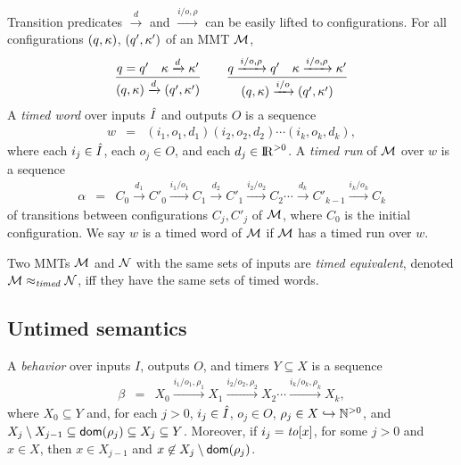 Transition predicates $\xrightarrow{d}$ and $\xrightarrow{i/o, \rho}$ can be easily lifted to configurations.
For all configurations $(q, \kappa)$, $(q', \kappa')$ of an MMT ${\cal M}$,
\[
\frac{q = q' \quad \kappa \xrightarrow{d} \kappa'}{(q,\kappa) \xrightarrow{d} (q',\kappa')}
\quad\quad
  \frac{q \xrightarrow{i/o,\rho} q' \quad \kappa \xrightarrow{i/o, \rho} \kappa'}{(q,\kappa) \xrightarrow{i/o} (q',\kappa')}
\]
A \emph{timed word} over inputs $\hat{I}$ and outputs $O$ is a sequence
\begin{eqnarray*}
w & = &  (i_1, o_1, d_1) (i_2, o_2, d_2) \cdots (i_k, o_k, d_k),
\end{eqnarray*}
where each $i_j \in \hat{I}$, each $o_j \in O$, and each $d_j \in {\rm I\!R}^{> 0}$.
A \emph{timed run} of ${\cal M}$ over $w$ is a sequence 
\begin{eqnarray*}
\alpha & = & C_0 \xrightarrow{d_1} C'_0 \xrightarrow{i_1/o_1} C_1 \xrightarrow{d_2} C'_1 \xrightarrow{i_2/o_2} C_2 \cdots
\xrightarrow{d_k} C'_{k-1} \xrightarrow{i_k/o_k} C_{k}
\end{eqnarray*}
of transitions between configurations $C_j, C'_j$ of ${\cal M}$, where $C_0$ is the initial configuration.
We say $w$ is a timed word of ${\cal M}$ if ${\cal M}$ has a timed run over $w$.

Two MMTs ${\cal M}$ and ${\cal N}$ with the same sets of inputs are \emph{timed equivalent}, denoted ${\cal M} \approx_{\mathit{timed}} {\cal N}$, iff 
they have the same sets of timed words.


\subsection{Untimed semantics}
A \emph{behavior} over inputs $I$, outputs $O$, and timers $Y \subseteq X$ is a sequence 
\begin{eqnarray*}
\beta & = & X_0 \xrightarrow{i_1/o_1, \rho_1} X_1  \xrightarrow{i_2/o_2, \rho_2} X_2 \cdots \xrightarrow{i_k/o_k, \rho_k} X_{k},
\end{eqnarray*}
where $X_0 \subseteq Y$ and, for each $j>0$,  $i_j \in \hat{I}$, $o_j \in O$, $\rho_j \in X \hookrightarrow {\mathbb N}^{>0}$, and
 $X_j \setminus X_{j-1}  \subseteq {\textsf{dom}}(\rho_j) \subseteq X_j \subseteq Y$.
Moreover, if $i_j = \mathit{to}[x]$, for some $j>0$ and $x \in X$, then $x \in X_{j-1}$ and $x \not\in X_j \setminus {\textsf{dom}}(\rho_j)$.

